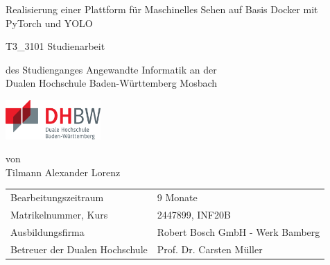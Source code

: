 \def\doctype{T3_3101 Studienarbeit}
\def\title{Realisierung einer Plattform für Maschinelles Sehen auf Basis Docker mit PyTorch und YOLO}
\def\author{Tilmann Alexander Lorenz}

\begin{titlepage}

    \vspace{10mm}

    \begin{center}
        \vspace{5mm}

        \huge \title

        \vspace{14.2pt}

        \large \doctype


        \vspace{42.6pt}

        \vspace{42.6pt}

        \small des Studienganges Angewandte Informatik an der \\
        \large Dualen Hochschule Baden-Württemberg Mosbach

        \vspace{14.2pt}

        \includegraphics[height=1.5cm]{data/img/logo-dhbw.eps}

        \vspace{42.6pt}

        \small von \\
        \large \author
    \end{center}

    \vspace{98.6pt}

    \begin{table}[h]
        \centering
        \begin{tabular}{ll}
            \small Bearbeitungszeitraum           & 9 Monate                         \\
            \small Matrikelnummer, Kurs           & 2447899, INF20B                  \\
            \small Ausbildungsfirma               & Robert Bosch GmbH - Werk Bamberg \\
            \small Betreuer der Dualen Hochschule & Prof. Dr. Carsten Müller         \\
        \end{tabular}
    \end{table}

    \vspace{49.7pt}


\end{titlepage}